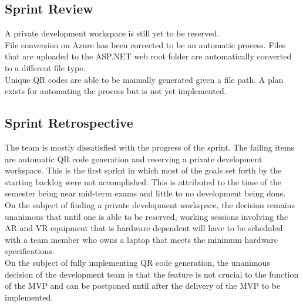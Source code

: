     \subsection{Sprint Review}
    \label{sec:Sprint4_review}
        \hspace{7mm}
        A private development workspace is still yet to be reserved.\\

        File conversion on Azure has been corrected to be an automatic process.  Files that are uploaded to
        the ASP.NET web root folder are automatically converted to a different file type.\\

        Unique QR codes are able to be manually generated given a file path.  A plan exists for automating
        the process but is not yet implemented.

    \subsection{Sprint Retrospective}
    \label{sec:Sprint4_retrospective}
        \hspace{7mm}
        The team is mostly dissatisfied with the progress of the sprint.  The failing items are automatic
        QR code generation and reserving a private development workspace.  This is the first sprint in which
        most of the goals set forth by the starting backlog were not accomplished.  This is attributed to the
        time of the semester being near mid-term exams and little to no development being done.\\

        On the subject of finding a private development workspace, the decision remains unanimous that until one 
        is able to be reserved, working sessions involving the AR and VR equipment that is hardware dependent 
        will have to be scheduled with a team member who owns a laptop that meets the minimum hardware
        specifications.\\

        On the subject of fully implementing QR code generation, the unanimous decision of the development team 
        is that the feature is not crucial to the function of the MVP and can be postponed until after the delivery
        of the MVP to be implemented.
